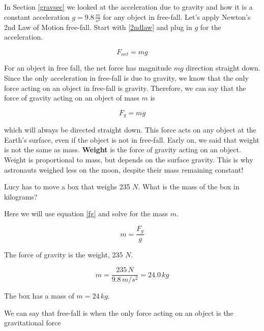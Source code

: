 \documentclass[12pt]{book}
\begin{document}
In Section \ref{gravsec} we looked at the acceleration due to gravity and how it is a constant acceleration $g = 9.8 \, \frac{m}{s^2}$ for any object in free-fall. Let's apply Newton's 2nd Law of Motion free-fall. Start with \ref{2ndlaw} and plug in $g$ for the acceleration.

\begin{equation}
F_{net} = mg
\end{equation}

For an object in free fall, the net force has magnitude $mg$ direction straight down. Since the only acceleration in free-fall is due to gravity, we know that the only force acting on an object in free-fall is gravity. Therefore, we can say that the force of gravity acting on an object of mass $m$ is

\begin{equation}
F_g = mg 
\label{fg}
\end{equation}

which will always be directed straight down. This force acts on any object at the Earth's surface, even if the object is not in free-fall. Early on, we said that weight is not the same as mass. \textbf{Weight} is the force of gravity acting on an object. Weight is proportional to mass, but depends on the surface gravity. This is why astronauts weighed less on the moon, despite their mass remaining constant!

\pagebreak

\begin{exampleblock}

Lucy has to move a box that weighs 235 $N$. What is the mass of the box in kilograms?

\hspace{10pt}

Here we will use equation \ref{fg} and solve for the mass $m$.

\begin{equation}
m = \frac{F_g}{g}
\end{equation}

The force of gravity is the weight, 235 $N$.

\begin{equation}
m = \frac{235 \, N}{9.8 \, m/s^2} = 24.0 \, kg
\end{equation}

The box has a mass of $m = 24 \, kg$.

\end{exampleblock}

We can say that free-fall is when the only force acting on an object is the gravitational force
\end{document}
